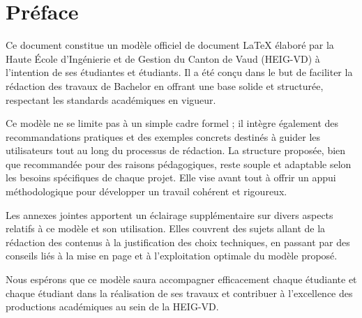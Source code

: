 \chapter*{Préface}

Ce document constitue un modèle officiel de document \LaTeX{} élaboré par la Haute École d'Ingénierie et de Gestion du Canton de Vaud (HEIG-VD) à l'intention de ses étudiantes et étudiants. Il a été conçu dans le but de faciliter la rédaction des travaux de Bachelor en offrant une base solide et structurée, respectant les standards académiques en vigueur.

Ce modèle ne se limite pas à un simple cadre formel ; il intègre également des recommandations pratiques et des exemples concrets destinés à guider les utilisateurs tout au long du processus de rédaction. La structure proposée, bien que recommandée pour des raisons pédagogiques, reste souple et adaptable selon les besoins spécifiques de chaque projet. Elle vise avant tout à offrir un appui méthodologique pour développer un travail cohérent et rigoureux.

Les annexes jointes apportent un éclairage supplémentaire sur divers aspects relatifs à ce modèle et son utilisation. Elles couvrent des sujets allant de la rédaction des contenus à la justification des choix techniques, en passant par des conseils liés à la mise en page et à l'exploitation optimale du modèle proposé.

Nous espérons que ce modèle saura accompagner efficacement chaque étudiante et chaque étudiant dans la réalisation de ses travaux et contribuer à l'excellence des productions académiques au sein de la HEIG-VD.

